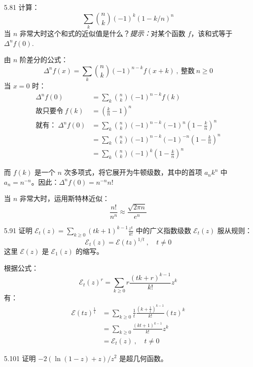 \begin{problem}{5.8}{1}
  计算：
  \[
    \sum_k \binom{n}{k} (-1)^k (1-k/n)^n
  \]
  当 \( n \) 非常大时这个和式的近似值是什么？\textit{提示：}对某个函数 \( f \)，该和式等于 \( \Delta^n f(0) \).
\end{problem}

由 \( n \) 阶差分的公式：
\[
  \Delta^n f(x) = \sum_k \binom{n}{k} (-1)^{n-k} f(x+k) \ , \ \text{整数} \ n \ge 0
\]
当 \( x = 0 \) 时：
\begin{align*}
  \Delta^n f(0) &= \sum_k \binom{n}{k} (-1)^{n-k} f(k) \\
  \text{故只要令} \ f(k) &= (\frac{k}{n} - 1)^n \\
  \text{就有：} \ \Delta^n f(0)  &= \sum_k \binom{n}{k} (-1)^{n-k} (-1)^n (1-\frac{k}{n})^n \\
  &= \sum_k \binom{n}{k} (-1)^{n-k} (-1)^{-n} (1-\frac{k}{n})^n \\
  &= \sum_k \binom{n}{k} (-1)^{k} (1-\frac{k}{n})^n
\end{align*}

而 \( f(k) \) 是一个 \( n \) 次多项式，将它展开为牛顿级数，其中的首项 \( a_n k^n \) 中 \( a_n = n^{-n} \)。因此：\( \Delta^n f(0) = n^{-n} n! \)

当 \( n \) 非常大时，运用斯特林近似：
\[
  \frac{n!}{n^n} \approx \frac{\sqrt{2 \pi n}}{e^n}
\]

\begin{problem}{5.9}{1}
  证明 \( \mathcal{E}_t (z) = \sum_{k \ge 0} (tk+1)^{k-1} \frac{z^k}{k!} \) 中的广义指数级数 \( \mathcal{E}_t (z) \) 服从规则：
  \[
    \mathcal{E}_t (z) = \mathcal{E} (tz)^{1/t} \ , \quad t \neq 0
  \]
  这里 \( \mathcal{E} (z) \) 是 \( \mathcal{E}_1 (z) \) 的缩写。
\end{problem}

根据公式：
\[
  \mathcal{E}_t (z)^r = \sum_{k \ge 0} r \frac{(tk + r)^{k-1}}{k!} z^k
\]
有：
\begin{align*}
  \mathcal{E} (tz)^{\frac{1}{t}} &= \sum_{k \ge 0} \frac{1}{t} \frac{(k + \frac{1}{t})^{k-1}}{k!} (tz)^k \\
  &= \sum_{k \ge 0} \frac{(kt + 1)^{k-1}}{k!} z^k \\
  &= \mathcal{E}_t (z) \ , \quad t \ne 0
\end{align*}

\begin{problem}{5.10}{1}
  证明 \( -2 (\ln{(1-z)} + z) / z^2 \) 是超几何函数。
\end{problem}

